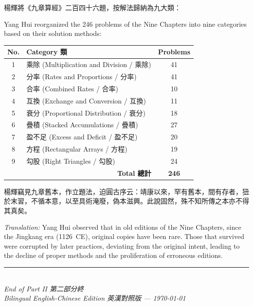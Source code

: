 \documentclass[11pt,a4paper]{article}
\newcommand{\longline}{\noindent\rule{\textwidth}{0.4pt}}
\newcommand{\zh}[1]{{\CJKfamily{\CJKrmdefault} #1}}
\newenvironment{chside}{%
  \begin{minipage}[t]{0.48\textwidth}%
  \setlength{\parindent}{1.5em}%
  \linespread{1.25}\selectfont%
  \small%
}{%
  \end{minipage}%
}
\newenvironment{enside}{%
  \hfill\begin{minipage}[t]{0.48\textwidth}%
  \setlength{\parindent}{1em}%
  \linespread{1.15}\selectfont%
  \small%
}{%
  \end{minipage}%
}
\begin{document}
\noindent\begin{chside}
楊輝將《九章算經》二百四十六題，按解法歸納為九大類：
\end{chside}%
\begin{enside}
Yang Hui reorganized the 246 problems of the Nine Chapters into nine
categories based on their solution methods:
\end{enside}

\vspace{0.5cm}

\begin{center}
\begin{longtable}{|c|l|c|}
\hline
\textbf{No.} & \textbf{Category \zh{類}} & \textbf{Problems} \\
\hline
1 & \zh{乘除} (Multiplication and Division / \zh{乘除}) & 41 \\
2 & \zh{分率} (Rates and Proportions / \zh{分率}) & 41 \\
3 & \zh{合率} (Combined Rates / \zh{合率}) & 10 \\
4 & \zh{互換} (Exchange and Conversion / \zh{互換}) & 11 \\
5 & \zh{衰分} (Proportional Distribution / \zh{衰分}) & 18 \\
6 & \zh{疊積} (Stacked Accumulations / \zh{疊積}) & 27 \\
7 & \zh{盈不足} (Excess and Deficit / \zh{盈不足}) & 20 \\
8 & \zh{方程} (Rectangular Arrays / \zh{方程}) & 19 \\
9 & \zh{勾股} (Right Triangles / \zh{勾股}) & 24 \\
\hline
\multicolumn{2}{|r|}{\textbf{Total \zh{總計}}} & \textbf{246} \\
\hline
\end{longtable}
\end{center}

\vspace{1cm}

\noindent\begin{chside}
\zh{楊輝竊見九章舊本，作立題法，迫圓古序云：靖康以來，罕有舊本，間有存者，狃於末習，不循本意，以至具術淹廢，偽本滋興。此說固然，殊不知所傳之本亦不得其真矣。}
\end{chside}%
\begin{enside}
\textit{Translation:} Yang Hui observed that in old editions of the Nine
Chapters, since the Jingkang era (1126~CE), original copies have been rare.
Those that survived were corrupted by later practices, deviating from the
original intent, leading to the decline of proper methods and the
proliferation of erroneous editions.
\end{enside}

\vspace{2cm}
\begin{center}
\longline\\[0.5cm]
{\small\textit{End of Part II \zh{第二部分終}}}\\[0.3cm]
{\footnotesize\textit{Bilingual English-Chinese Edition \zh{英漢對照版} --- \today}}
\end{center}
\end{document}
